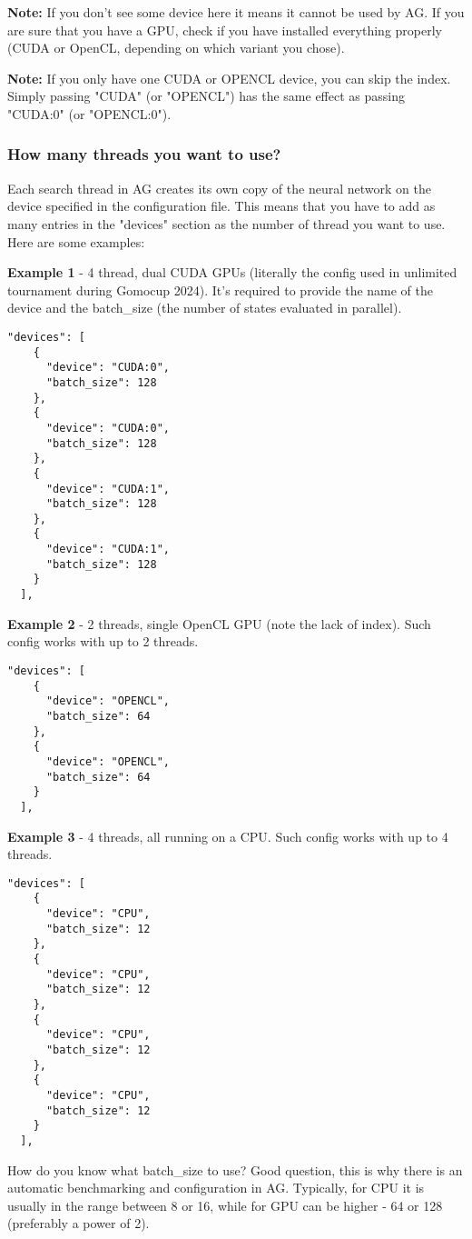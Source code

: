 \documentclass[12pt,a4paper]{article}
\begin{document}
\textbf{Note:} If you don't see some device here it means it cannot be used by AG. If you are sure that you have a GPU, check if you have installed everything properly (CUDA or OpenCL, depending on which variant you chose).

\textbf{Note:} If you only have one CUDA or OPENCL device, you can skip the index. Simply passing "CUDA" (or "OPENCL") has the same effect as passing "CUDA:0" (or "OPENCL:0").

\subsubsection{How many threads you want to use?}
Each search thread in AG creates its own copy of the neural network on the device specified in the configuration file. This means that you have to add as many entries in the "devices" section as the number of thread you want to use. Here are some examples:

\textbf{Example 1} - 4 thread, dual CUDA GPUs (literally the config used in unlimited tournament during Gomocup 2024). It's required to provide the name of the device and the batch{\_}size (the number of states evaluated in parallel).
\begin{verbatim}
"devices": [
    {
      "device": "CUDA:0",
      "batch_size": 128
    },
    {
      "device": "CUDA:0",
      "batch_size": 128
    },
    {
      "device": "CUDA:1",
      "batch_size": 128
    },
    {
      "device": "CUDA:1",
      "batch_size": 128
    }
  ],
\end{verbatim}


\textbf{Example 2} - 2 threads, single OpenCL GPU (note the lack of index). Such config works with up to 2 threads.
\begin{verbatim}
"devices": [
    {
      "device": "OPENCL",
      "batch_size": 64
    },
    {
      "device": "OPENCL",
      "batch_size": 64
    }
  ],
\end{verbatim}

\textbf{Example 3} - 4 threads, all running on a CPU. Such config works with up to 4 threads.
\begin{verbatim}
"devices": [
    {
      "device": "CPU",
      "batch_size": 12
    },
    {
      "device": "CPU",
      "batch_size": 12
    },
    {
      "device": "CPU",
      "batch_size": 12
    },
    {
      "device": "CPU",
      "batch_size": 12
    }
  ],
\end{verbatim}
How do you know what batch{\_}size to use? Good question, this is why there is an automatic benchmarking and configuration in AG. Typically, for CPU it is usually in the range between 8 or 16, while for GPU can be higher - 64 or 128 (preferably a power of 2).
\end{document}
